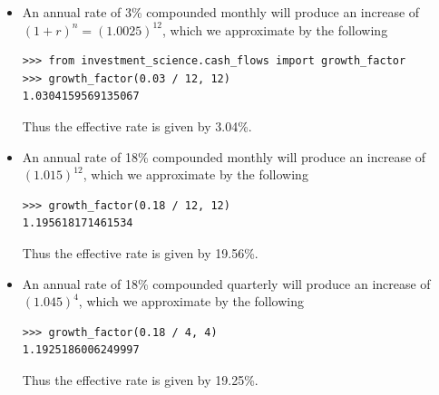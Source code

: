 \begin{itemize}
    \item[(a)] An annual rate of 3\% compounded monthly will produce an
        increase of ${(1 + r)}^n = {(1.0025)}^{12}$, which we approximate by the
        following
        \begin{lstlisting}
>>> from investment_science.cash_flows import growth_factor
>>> growth_factor(0.03 / 12, 12)
1.0304159569135067
        \end{lstlisting}
        Thus the effective rate is given by 3.04\%.
    \item[(b)] An annual rate of 18\% compounded monthly will produce an
        increase of ${(1.015)}^{12}$, which we approximate by the following
        \begin{lstlisting}
>>> growth_factor(0.18 / 12, 12)
1.195618171461534
        \end{lstlisting}
        Thus the effective rate is given by 19.56\%.
    \item[(c)] An annual rate of 18\% compounded quarterly will produce an
        increase of ${(1.045)}^4$, which we approximate by the following
        \begin{lstlisting}
>>> growth_factor(0.18 / 4, 4)
1.1925186006249997
        \end{lstlisting}
        Thus the effective rate is given by 19.25\%.
\end{itemize}
